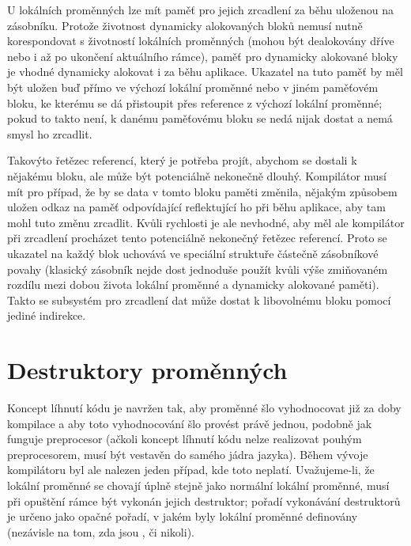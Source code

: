 U lokálních \ctime proměnných lze mít paměť pro jejich zrcadlení za běhu uloženou na zásobníku. Protože životnost dynamicky alokovaných \ctime bloků nemusí nutně korespondovat s životností lokálních proměnných (mohou být dealokovány dříve nebo i až po ukončení aktuálního rámce), paměť pro dynamicky alokované \ctime bloky je vhodné dynamicky alokovat i za běhu aplikace. Ukazatel na tuto paměť by měl být uložen buď přímo ve výchozí \ctime lokální proměnné nebo v jiném paměťovém bloku, ke kterému se dá přistoupit přes reference z výchozí lokální proměnné; pokud to takto není, k danému paměťovému bloku se nedá nijak dostat a nemá smysl ho zrcadlit.

Takovýto řetězec referencí, který je potřeba projít, abychom se dostali k nějakému bloku, ale může být potenciálně nekonečně dlouhý. Kompilátor musí mít pro případ, že by se data v tomto \ctime bloku paměti změnila, nějakým způsobem uložen odkaz na paměť odpovídající reflektující ho při běhu aplikace, aby tam mohl tuto změnu zrcadlit. Kvůli rychlosti je ale nevhodné, aby měl ale kompilátor při zrcadlení procházet tento potenciálně nekonečný řetězec referencí. Proto se ukazatel na každý blok uchovává ve speciální struktuře částečně zásobníkové povahy (klasický zásobník nejde dost jednoduše použít kvůli výše zmiňovaném rozdílu mezi dobou života lokální proměnné a dynamicky alokované \ctime paměti). Takto se subsystém pro zrcadlení \ctime dat může dostat k libovolnému bloku pomocí jediné indirekce.


\section{Destruktory \ctime proměnných}
Koncept líhnutí kódu je navržen tak, aby \ctime proměnné šlo vyhodnocovat již za doby kompilace a aby toto vyhodnocování šlo provést právě jednou, podobně jak funguje preprocesor (ačkoli koncept líhnutí kódu nelze realizovat pouhým preprocesorem, musí být vestavěn do samého jádra jazyka). Během vývoje kompilátoru byl ale nalezen jeden případ, kde toto neplatí. Uvažujeme-li, že lokální \ctime proměnné se chovají úplně stejně jako normální lokální proměnné, musí při opuštění rámce být vykonán jejich destruktor; pořadí vykonávání destruktorů je určeno jako opačné pořadí, v jakém byly lokální proměnné definovány (nezávisle na tom, zda jsou \ctime, či nikoli).

